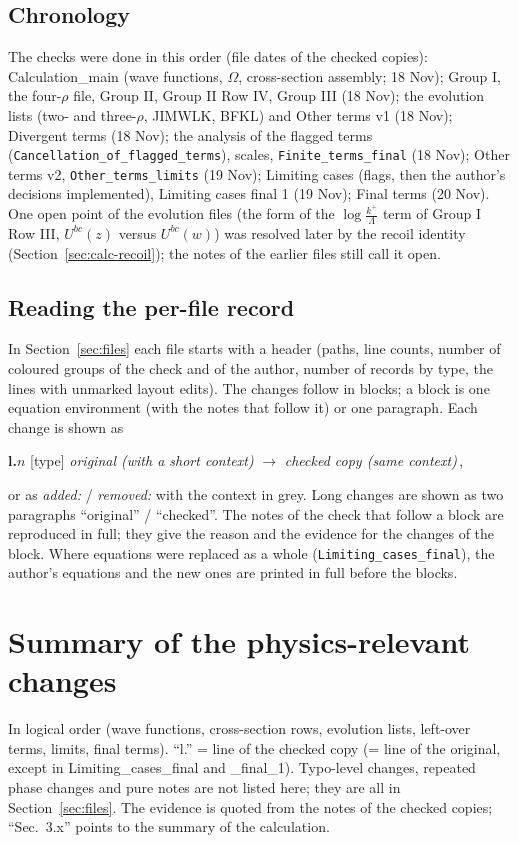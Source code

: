 \documentclass[10pt]{article}
\begin{document}
\subsection{Chronology}
\noindent The checks were done in this order (file dates of the checked copies): Calculation\_main (wave functions, $\Omega$, cross-section assembly; 18 Nov); Group I, the four-$\rho$ file, Group II, Group II Row IV, Group III (18 Nov); the evolution lists (two- and three-$\rho$, JIMWLK, BFKL) and Other terms v1 (18 Nov); Divergent terms (18 Nov); the analysis of the flagged terms (\texttt{Cancellation\_of\_flagged\_terms}), scales, \texttt{Finite\_terms\_final} (18 Nov); Other terms v2, \texttt{Other\_terms\_limits} (19 Nov); Limiting cases (flags, then the author's decisions implemented), Limiting cases final 1 (19 Nov); Final terms (20 Nov). One open point of the evolution files (the form of the $\log\frac{k^{+}}{\Lambda}$ term of Group I Row III, $U^{bc}(z)$ versus $U^{bc}(w)$) was resolved later by the recoil identity (Section~\ref{sec:calc-recoil}); the notes of the earlier files still call it open.

\subsection{Reading the per-file record}
\noindent In Section~\ref{sec:files} each file starts with a header (paths, line counts, number of coloured groups of the check and of the author, number of records by type, the lines with unmarked layout edits). The changes follow in blocks; a block is one equation environment (with the notes that follow it) or one paragraph. Each change is shown as
\begin{center}
\textbf{l.$n$} \textsf{\small[type]} \emph{original (with a short context)} $\longrightarrow$ \emph{checked copy (same context)}\,,
\end{center}
or as \emph{added:} / \emph{removed:} with the context in grey. Long changes are shown as two paragraphs ``original'' / ``checked''. The notes of the check that follow a block are reproduced in full; they give the reason and the evidence for the changes of the block. Where equations were replaced as a whole (\texttt{Limiting\_cases\_final}), the author's equations and the new ones are printed in full before the blocks.
\clearpage
\section{Summary of the physics-relevant changes}\label{sec:summary}
\noindent In logical order (wave functions, cross-section rows, evolution lists, left-over terms, limits, final terms). ``l.'' = line of the checked copy (= line of the original, except in Limiting\_cases\_final and \_final\_1). Typo-level changes, repeated phase changes and pure notes are not listed here; they are all in Section~\ref{sec:files}. The evidence is quoted from the notes of the checked copies; ``Sec.~3.x'' points to the summary of the calculation.
\end{document}
